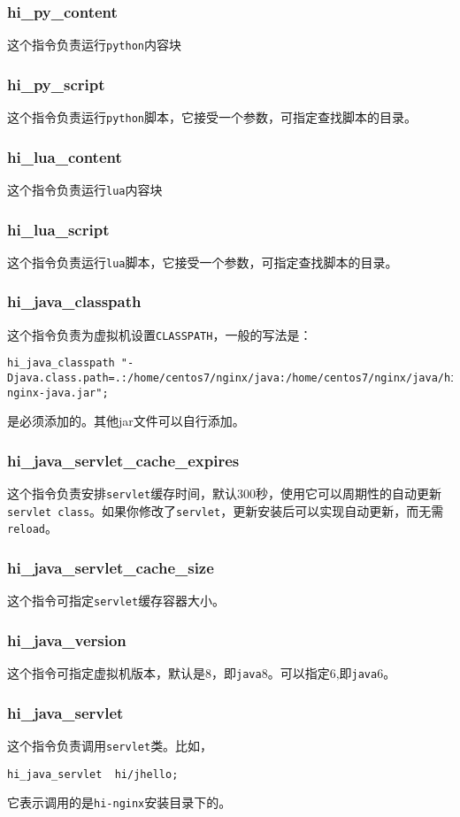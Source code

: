 \subsubsection{hi_py_content}
这个指令负责运行\texttt{python}内容块
\subsubsection{hi_py_script}
这个指令负责运行\texttt{python}脚本，它接受一个参数，可指定查找脚本的目录。
\subsubsection{hi_lua_content}
这个指令负责运行\texttt{lua}内容块
\subsubsection{hi_lua_script}
这个指令负责运行\texttt{lua}脚本，它接受一个参数，可指定查找脚本的目录。
\subsubsection{hi_java_classpath}
这个指令负责为虚拟机设置\texttt{CLASSPATH}，一般的写法是：
\begin{lstlisting}
hi_java_classpath "-Djava.class.path=.:/home/centos7/nginx/java:/home/centos7/nginx/java/hi-nginx-java.jar";
\end{lstlisting}
是必须添加的。其他jar文件可以自行添加。
\subsubsection{hi_java_servlet_cache_expires}
这个指令负责安排\texttt{servlet}缓存时间，默认300秒，使用它可以周期性的自动更新\texttt{servlet class}。如果你修改了\texttt{servlet}，更新安装后可以实现自动更新，而无需\texttt{reload}。
\subsubsection{hi_java_servlet_cache_size}
这个指令可指定\texttt{servlet}缓存容器大小。
\subsubsection{hi_java_version}
这个指令可指定虚拟机版本，默认是8，即\texttt{java}8。可以指定6,即\texttt{java}6。
\subsubsection{hi_java_servlet}
这个指令负责调用\texttt{servlet}类。比如，
\begin{lstlisting}
hi_java_servlet  hi/jhello;
\end{lstlisting}
它表示调用的是\texttt{hi-nginx}安装目录下的。














